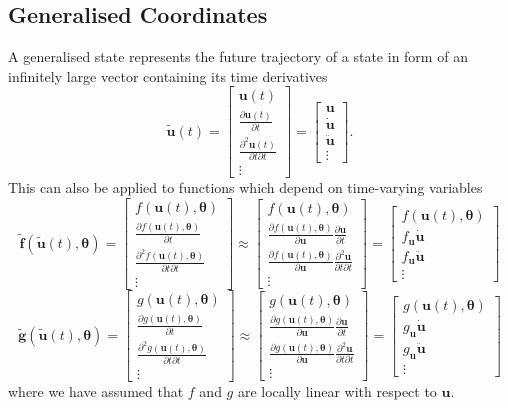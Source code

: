 \documentclass[a4paper,10pt]{article}
\newcommand{\bs}[1]{\mathbf{#1}}					%
\newcommand{\bgs}[1]{\boldsymbol{#1}}				%
\newcommand{\pd}[2]{\frac{\partial #1}{\partial #2}} 	%
\newcommand{\ppd}[3]{\frac{\partial^2 #1}{\partial #2 \partial #3}} %
\newcommand{\eq}[1]{\begin{equation} #1 \end{equation}}%
\newcommand{\gc}[1]{\tilde{#1}} %
\renewcommand{\ss}{u}         %
\renewcommand{\sp}{\theta}    %
\newcommand{\ps}{\bs{\ss}}    %
\newcommand{\psg}{\gc{\ps}}    %
\newcommand{\pp}{\bgs{\sp}} %
\begin{document}
\subsection{Generalised Coordinates}
A generalised state represents the future trajectory of a state in form of an infinitely large vector containing its time derivatives
\eq{
    \psg(t) = \left[\begin{array}{c} \ps(t)\\ \pd{\ps(t)}{t}\\ \ppd{\ps(t)}{t}{t}\\ \vdots \end{array}\right] = \left[\begin{array}{c} \ps\\ \dot{\ps}\\ \ddot{\ps}\\ \vdots \end{array}\right].
}
This can also be applied to functions which depend on time-varying variables
\eq{\label{eq:gcf}
    \gc{\bs{f}}(\psg(t),\pp) = \left[\begin{array}{c} f(\ps(t),\pp)\\ \pd{f(\ps(t),\pp)}{t}\\ \ppd{f(\ps(t),\pp)}{t}{t}\\ \vdots \end{array}\right] \approx \left[\begin{array}{c} f(\ps(t),\pp)\\ \pd{f(\ps(t),\pp)}{\ps}\pd{\ps}{t}\\ \pd{f(\ps(t),\pp)}{\ps}\ppd{\ps}{t}{t}\\ \vdots \end{array}\right] = \left[\begin{array}{c} f(\ps(t),\pp)\\ f_\ps\dot{\ps}\\ f_\ps\ddot{\ps}\\ \vdots \end{array}\right]
}
\eq{
    \gc{\bs{g}}(\psg(t),\pp) = \left[\begin{array}{c} g(\ps(t),\pp)\\ \pd{g(\ps(t),\pp)}{t}\\ \ppd{g(\ps(t),\pp)}{t}{t}\\ \vdots \end{array}\right] \approx \left[\begin{array}{c} g(\ps(t),\pp)\\ \pd{g(\ps(t),\pp)}{\ps}\pd{\ps}{t}\\ \pd{g(\ps(t),\pp)}{\ps}\ppd{\ps}{t}{t}\\ \vdots \end{array}\right] = \left[\begin{array}{c} g(\ps(t),\pp)\\ g_\ps\dot{\ps}\\ g_\ps\ddot{\ps}\\ \vdots \end{array}\right]
}
where we have assumed that $f$ and $g$ are locally linear with respect to $\ps$. 
\end{document}
